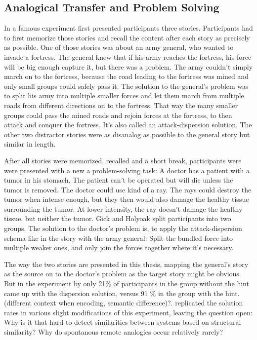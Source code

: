 \documentclass[a4paper,man,natbib,floatsintext,import]{apa6}
\begin{document}
\subsection{Analogical Transfer and Problem Solving}
In a famous experiment \cite{Gick1980} first presented participants three stories. Participants had to first memorize those stories and recall the content after each story as precisely as possible. One of those stories was about an army general, who wanted to invade a fortress. The general knew that if his army reaches the fortress, his force will be big enough capture it, but there was a problem. The army couldn't simply march on to the fortress, because the road leading to the fortress was mined and only small groups could safely pass it. The solution to the general's problem was to split his army into multiple smaller forces and let them march from multiple roads from different directions on to the fortress. That way the many smaller groups could pass the mined roads and rejoin forces at the fortress, to then attack and conquer the fortress. It's also called an attack-dispersion solution. The other two distractor stories were as disanalog as possible to the general story but similar in length.

After all stories were memorized, recalled and a short break, participants were were presented with a new a problem-solving task: A doctor has a patient with a tumor in his stomach. The patient can't be operated but will die unless the tumor is removed. The doctor could use kind of a ray. The rays could destroy the tumor when intense enough, but they then would also damage the healthy tissue surrounding the tumor. At lower intensity, the ray doesn't damage the healthy tissue, but neither the tumor. Gick and Holyoak split participants into two groups. The solution to the doctor's problem is, to apply the attack-dispersion schema like in the story with the army general: Split the bundled force into multiple weaker ones, and only join the forces together where it's necessary.

The way the two stories are presented in this thesis, mapping the general's story as the source on to the doctor's problem as the target story might be obvious. But in the experiment by \cite{Gick1980} only 21\% of participants in the group without the hint came up with the dispersion solution, versus 91 \% in the group with the hint. (different context when encoding, semantic difference)?. \cite{Gick1983} replicated the solution rates in various slight modifications of this experiment, leaving the question open: Why is it that hard to detect similarities between systems based on structural similarity? Why do spontanous remote analogies occur relatively rarely?
\end{document}
